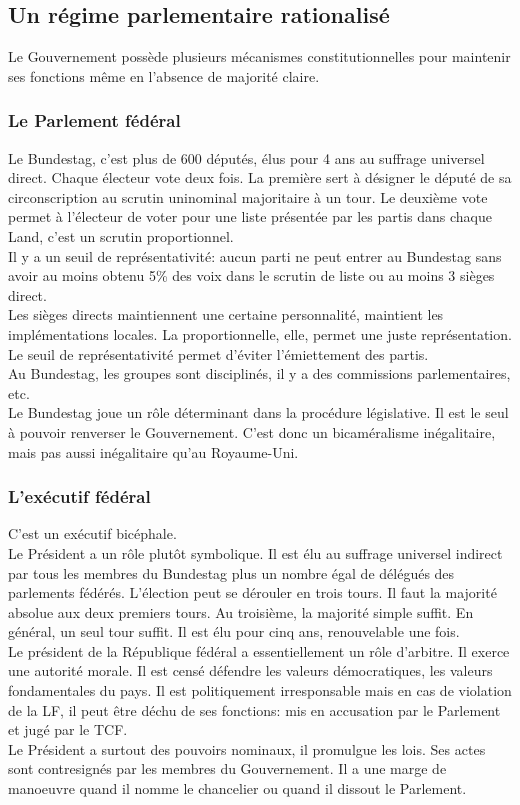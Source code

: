 \documentclass[10pt, a4paper, openany]{book}
\begin{document}
\subsection{Un régime parlementaire rationalisé}

Le Gouvernement possède plusieurs mécanismes constitutionnelles pour maintenir ses fonctions même en l'absence de majorité claire. 

\subsubsection{Le Parlement fédéral}

Le Bundestag, c'est plus de 600 députés, élus pour 4 ans au suffrage universel direct. Chaque électeur vote deux fois. La première sert à désigner le député de sa circonscription au scrutin uninominal majoritaire à un tour. Le deuxième vote permet à l'électeur de voter pour une liste présentée par les partis dans chaque Land, c'est un scrutin proportionnel. \\
Il y a un seuil de représentativité: aucun parti ne peut entrer au Bundestag sans avoir au moins obtenu 5\% des voix dans le scrutin de liste ou au moins 3 sièges direct. \\
Les sièges directs maintiennent une certaine personnalité, maintient les implémentations locales. La proportionnelle, elle, permet une juste représentation. Le seuil de représentativité permet d'éviter l'émiettement des partis. \\
Au Bundestag, les groupes sont disciplinés, il y a des commissions parlementaires, etc. \\
Le Bundestag joue un rôle déterminant dans la procédure législative. Il est le seul à pouvoir renverser le Gouvernement. C'est donc un bicaméralisme inégalitaire, mais pas aussi inégalitaire qu'au Royaume-Uni. 

\subsubsection{L'exécutif fédéral}

C'est un exécutif bicéphale. \\
Le Président a un rôle plutôt symbolique. Il est élu au suffrage universel indirect par tous les membres du Bundestag plus un nombre égal de délégués des parlements fédérés. L'élection peut se dérouler en trois tours. Il faut la majorité absolue aux deux premiers tours. Au troisième, la majorité simple suffit. En général, un seul tour suffit. Il est élu pour cinq ans, renouvelable une fois. \\
Le président de la République fédéral a essentiellement un rôle d'arbitre. Il exerce une autorité morale. Il est censé défendre les valeurs démocratiques, les valeurs fondamentales du pays. Il est politiquement irresponsable mais en cas de violation de la LF, il peut être déchu de ses fonctions: mis en accusation par le Parlement et jugé par le TCF. \\
Le Président a surtout des pouvoirs nominaux, il promulgue les lois. Ses actes sont contresignés par les membres du Gouvernement. Il a une marge de manoeuvre quand il nomme le chancelier ou quand il dissout le Parlement.
\end{document}
